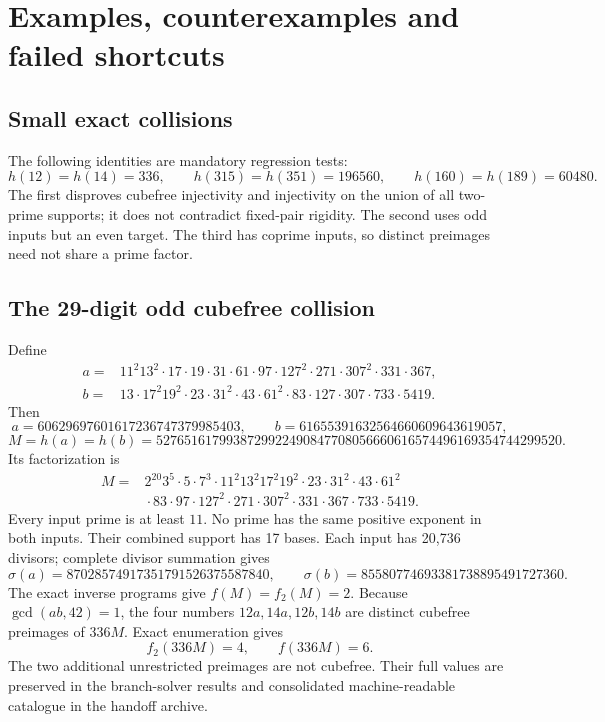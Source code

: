 \chapter{Examples, counterexamples and failed shortcuts}\label{ch:examples}
\section{Small exact collisions}
The following identities are mandatory regression tests:
\[
 h(12)=h(14)=336,\qquad
 h(315)=h(351)=196560,\qquad
 h(160)=h(189)=60480.
\]
The first disproves cubefree injectivity and injectivity on the union of all
two-prime supports; it does not contradict fixed-pair rigidity. The second
uses odd inputs but an even target. The third has coprime inputs, so distinct
preimages need not share a prime factor.

\section{The 29-digit odd cubefree collision}\label{examples:M}
Define
\begin{align*}
 a={}&11^2 13^2\cdot17\cdot19\cdot31\cdot61\cdot97\cdot127^2
       \cdot271\cdot307^2\cdot331\cdot367,\\
 b={}&13\cdot17^2 19^2\cdot23\cdot31^2\cdot43\cdot61^2
       \cdot83\cdot127\cdot307\cdot733\cdot5419.
\end{align*}
Then
\[
 a=60629697601617236747379985403,\qquad
 b=61655391632564660609643619057,
\]
\[
 M=h(a)=h(b)=5276516179938729922490847708056660616574496169354744299520.
\]
Its factorization is
\begin{align*}
 M={}&2^{20}3^5\cdot5\cdot7^3\cdot11^2 13^2 17^2 19^2
       \cdot23\cdot31^2\cdot43\cdot61^2\\
    &{}\cdot83\cdot97\cdot127^2\cdot271\cdot307^2\cdot331\cdot367
       \cdot733\cdot5419.
\end{align*}
Every input prime is at least $11$. No prime has the same positive exponent
in both inputs. Their combined support has 17 bases. Each input has 20,736
divisors; complete divisor summation gives
\[
 \sigma(a)=87028574917351791526375587840,\qquad
 \sigma(b)=85580774693381738895491727360.
\]
The exact inverse programs give $f(M)=f_2(M)=2$.
Because $\gcd(ab,42)=1$, the four numbers $12a,14a,12b,14b$ are distinct
cubefree preimages of $336M$. Exact enumeration gives
\[
 f_2(336M)=4,\qquad f(336M)=6.
\]
The two additional unrestricted preimages are not cubefree. Their full values
are preserved in the branch-solver results and consolidated machine-readable
catalogue in the handoff archive.


